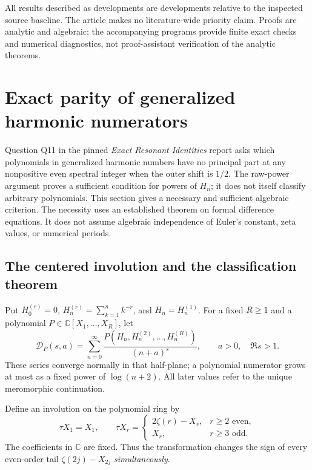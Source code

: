 \documentclass[11pt,a4paper]{article}
\numberwithin{equation}{section}
\theoremstyle{definition}
\theoremstyle{remark}
\begin{document}
All results described as developments are developments relative to
the inspected source baseline. The article makes no literature-wide
priority claim. Proofs are analytic and algebraic; the accompanying
programs provide finite exact checks and numerical diagnostics, not
proof-assistant verification of the analytic theorems.



\section{Exact parity of generalized harmonic numerators}
\label{ghp:sec}

Question Q11 in the pinned \emph{Exact Resonant Identities} report
\cite{ghp:ExactResonant} asks which polynomials in generalized harmonic
numbers have no principal part at any nonpositive even spectral integer
when the outer shift is $1/2$. The raw-power argument proves a sufficient
condition for powers of $H_n$; it does not itself classify arbitrary
polynomials. This section gives a necessary and sufficient algebraic
criterion. The necessity uses an established theorem on formal
difference equations. It does not assume algebraic independence of
Euler's constant, zeta values, or numerical periods.

\subsection{The centered involution and the classification theorem}

Put $H_0^{(r)}=0$, $H_n^{(r)}=\sum_{k=1}^n k^{-r}$, and $H_n=H_n^{(1)}$.
For a fixed $R\geq1$ and a polynomial $P\in\mathbb C[X_1,\ldots,X_R]$,
let
\begin{equation}\label{ghp:def:series}
 \mathcal D_P(s,a)=\sum_{n=0}^{\infty}
  \frac{P(H_n,H_n^{(2)},\ldots,H_n^{(R)})}{(n+a)^s},
 \qquad a>0,\quad \Re s>1.
\end{equation}
These series converge normally in that half-plane; a polynomial
numerator grows at most as a fixed power of $\log(n+2)$.
All later values refer to the unique meromorphic continuation.

Define an involution on the polynomial ring by
\begin{equation}\label{ghp:def:tau}
 \tau X_1=X_1,\qquad
 \tau X_r=\begin{cases}
       2\zeta(r)-X_r,&r\geq2\text{ even},\\
       X_r,&r\geq3\text{ odd}.
       \end{cases}
\end{equation}
The coefficients in $\mathbb C$ are fixed. Thus the transformation
changes the sign of every even-order tail $\zeta(2j)-X_{2j}$
\emph{simultaneously}.
\end{document}
